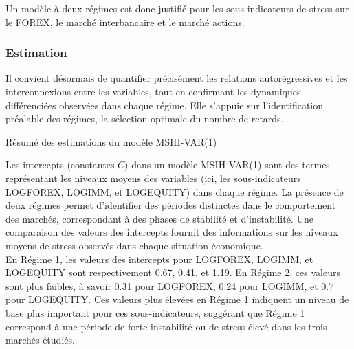 Un modèle à deux régimes est donc justifié pour les sous-indicateurs de stress sur le FOREX, le marché interbancaire et le marché actions.

\subsubsection{Estimation}

Il convient désormais de quantifier précisément les relations autorégressives et les interconnexions entre les variables, tout en confirmant les dynamiques différenciées observées dans chaque régime. Elle s’appuie sur l’identification préalable des régimes, la sélection optimale du nombre de retards. 

\begin{table}[H]
    \centering
    \caption{Résumé des estimations du modèle MSIH-VAR(1)}
    \sffamily
     \resizebox{0.5\textwidth}{!}{}
    \label{tab:comparaison2}
\end{table}

Les intercepts (constantes $C$) dans un modèle MSIH-VAR(1) sont des termes représentant les niveaux moyens des variables (ici, les sous-indicateurs LOGFOREX, LOGIMM, et LOGEQUITY) dans chaque régime. La présence de deux régimes permet d'identifier des périodes distinctes dans le comportement des marchés, correspondant à des phases de stabilité et d’instabilité. Une comparaison des valeurs des intercepts fournit des informations sur les niveaux moyens de stress observés dans chaque situation économique.\\

En Régime 1, les valeurs des intercepts pour LOGFOREX, LOGIMM, et LOGEQUITY sont respectivement 0.67, 0.41, et 1.19. En Régime 2, ces valeurs sont plus faibles, à savoir 0.31 pour LOGFOREX, 0.24 pour LOGIMM, et 0.7 pour LOGEQUITY. Ces valeurs plus élevées en Régime 1 indiquent un niveau de base plus important pour ces sous-indicateurs, suggérant que Régime 1 correspond à une période de forte instabilité ou de stress élevé dans les trois marchés étudiés.\\

